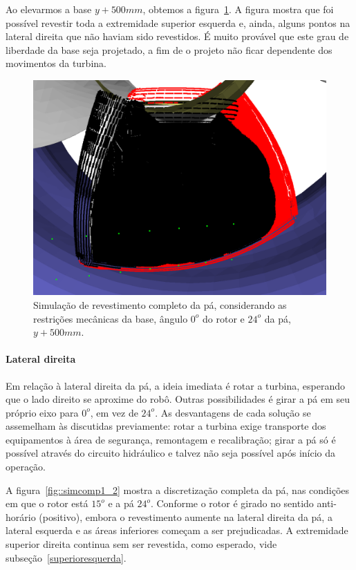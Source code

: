 Ao elevarmos a base $y+500 mm$, obtemos a figura~\ref{fig::simcomp1_6}. A figura
mostra que foi possível revestir toda a extremidade superior esquerda e, ainda,
alguns pontos na lateral direita que não haviam sido revestidos. É muito
provável que este grau de liberdade da base seja projetado, a fim de o projeto
não ficar dependente dos movimentos da turbina.

\begin{figure}[!ht]
	\centering	
	\includegraphics[width=0.7\columnwidth]{method/figs/simcomp1_6.png}
	\caption{Simulação de revestimento completo da pá, considerando as
	restrições mecânicas da base, ângulo $0^o$ do rotor e $24^o$ da pá,
	$y+500 mm$.}
	\label{fig::simcomp1_6}
\end{figure}

\paragraph{Lateral direita}
Em relação à lateral direita da pá, a ideia imediata é rotar a turbina,
esperando que o lado direito se aproxime do robô. Outras possibilidades é
girar a pá em seu próprio eixo para $0^o$, em vez de $24^o$. As desvantagens de
cada solução se assemelham às discutidas previamente: rotar a turbina exige
transporte dos equipamentos à área de segurança, remontagem e recalibração;
girar a pá só é possível através do circuito hidráulico e talvez não seja
possível após início da operação.

A figura~\ref{fig::simcomp1_2} mostra a discretização completa da pá, nas
condições em que o rotor está $15^o$ e a pá $24^o$. Conforme o rotor é
girado no sentido anti-horário (positivo), embora o revestimento aumente na
lateral direita da pá, a lateral esquerda e as áreas inferiores começam a ser
prejudicadas. A extremidade superior direita continua sem ser revestida, como
esperado, vide subseção~\ref{superioresquerda}.

